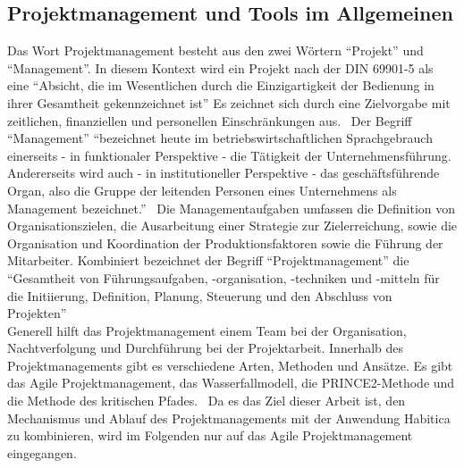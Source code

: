 \documentclass[sigconf, nonacm]{acmart}
\begin{document}
\subsection{Projektmanagement und Tools im Allgemeinen}
Das Wort Projektmanagement besteht aus den zwei Wörtern \enquote{Projekt} und \enquote{Management}. 
In diesem Kontext wird ein Projekt nach der DIN 69901-5 als eine \enquote{Absicht, die im Wesentlichen durch die Einzigartigkeit der Bedienung in ihrer Gesamtheit gekennzeichnet ist} Es zeichnet sich durch eine Zielvorgabe mit zeitlichen, finanziellen und personellen Einschränkungen aus.~\cite{DIN69901-5} 
Der Begriff \enquote{Management} \enquote{bezeichnet heute im betriebswirtschaftlichen Sprachgebrauch einerseits - in funktionaler Perspektive - die Tätigkeit der Unternehmensführung. Andererseits wird auch - in institutioneller Perspektive - das geschäftsführende Organ, also die Gruppe der leitenden Personen eines Unternehmens als Management bezeichnet.}~\cite{haric_definition_nodate} 
Die Managementaufgaben umfassen die Definition von Organisationszielen, die Ausarbeitung einer Strategie zur Zielerreichung, sowie die Organisation und Koordination der Produktionsfaktoren sowie die Führung der Mitarbeiter.
Kombiniert bezeichnet der Begriff \enquote{Projektmanagement} die \enquote{Gesamtheit von Führungsaufgaben, -organisation, -techniken und -mitteln für die Initiierung, Definition, Planung, Steuerung und den Abschluss von Projekten}~\cite{DIN69901-5}
\\
Generell hilft das Projektmanagement einem Team bei der Organisation, Nachtverfolgung und Durchführung bei der Projektarbeit. Innerhalb des Projektmanagements gibt es verschiedene Arten, Methoden und Ansätze. Es gibt das Agile Projektmanagement, das Wasserfallmodell, die PRINCE2-Methode und die Methode des kritischen Pfades.~\cite{asana_projektmanagement_nodate} Da es das Ziel dieser Arbeit ist, den Mechanismus und Ablauf des Projektmanagements mit der Anwendung Habitica zu kombinieren, wird im Folgenden nur auf das Agile Projektmanagement eingegangen.
\end{document}
